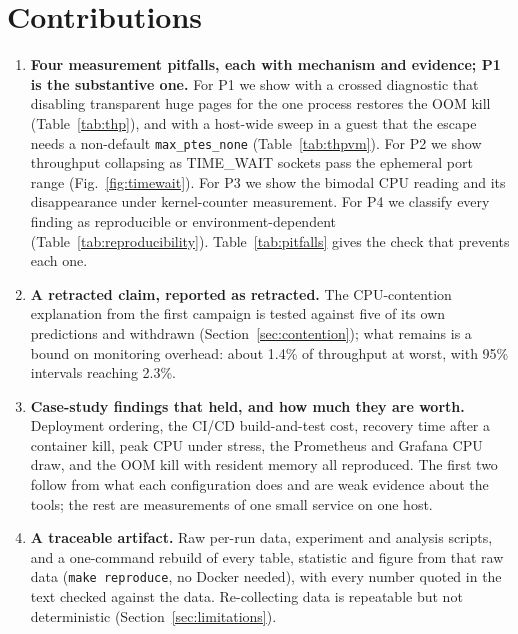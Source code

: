 \documentclass[conference]{IEEEtran}
\begin{document}
\section{Contributions}
\label{sec:contributions}
\begin{enumerate}
\item \textbf{Four measurement pitfalls, each with mechanism and evidence; P1 is the
substantive one.} For
P1 we show with a crossed diagnostic that disabling transparent huge pages for the
one process restores the OOM kill (Table~\ref{tab:thp}), and with a host-wide sweep in a
guest that the escape needs a non-default \texttt{max\_ptes\_none} (Table~\ref{tab:thpvm}). For P2 we show throughput
collapsing as TIME\_WAIT sockets pass the ephemeral port range
(Fig.~\ref{fig:timewait}). For P3 we show the bimodal CPU reading and its
disappearance under kernel-counter measurement. For P4 we classify every finding
as reproducible or environment-dependent (Table~\ref{tab:reproducibility}).
Table~\ref{tab:pitfalls} gives the check that prevents each one.
\item \textbf{A retracted claim, reported as retracted.} The CPU-contention
explanation from the first campaign is tested against five of its own predictions and
withdrawn (Section~\ref{sec:contention}); what remains is a bound on monitoring
overhead: about 1.4\% of throughput at worst, with 95\% intervals reaching 2.3\%.
\item \textbf{Case-study findings that held, and how much they are worth.} Deployment
ordering, the CI/CD build-and-test cost, recovery time after a container kill, peak CPU
under stress, the Prometheus and Grafana CPU draw, and the OOM kill with resident memory
all reproduced. The first two follow from what each configuration does and are weak
evidence about the tools; the rest are measurements of one small service on one host.
\item \textbf{A traceable artifact.} Raw per-run data, experiment and analysis
scripts, and a one-command rebuild of every table, statistic and figure from that
raw data (\texttt{make reproduce}, no Docker needed), with every number quoted in the
text checked against the data. Re-collecting data is repeatable but not
deterministic (Section~\ref{sec:limitations}).
\end{enumerate}
\end{document}
